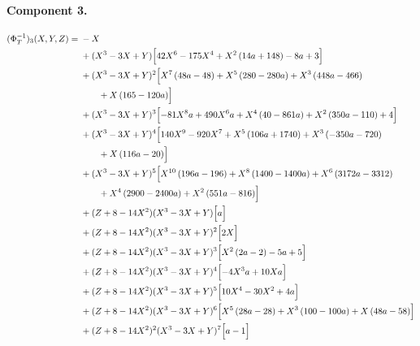 \paragraph{Component 3.}
\begingroup
\footnotesize
\allowdisplaybreaks[0]
\begin{align*}
(\Phi_T^{-1})_3(X,Y,Z)={}&- X\\
&{}+(X^3-3X+Y)\Bigl[42 X^{6} - 175 X^{4} + X^{2} \left(14 a + 148\right) - 8 a + 3\Bigr]\\
&{}+(X^3-3X+Y)^{2}\Bigl[X^{7} \left(48 a - 48\right) + X^{5} \left(280 - 280 a\right) + X^{3} \left(448 a - 466\right)\\
&\qquad + X \left(165 - 120 a\right)\Bigr]\\
&{}+(X^3-3X+Y)^{3}\Bigl[- 81 X^{8} a + 490 X^{6} a + X^{4} \left(40 - 861 a\right) + X^{2} \left(350 a - 110\right) + 4\Bigr]\\
&{}+(X^3-3X+Y)^{4}\Bigl[140 X^{9} - 920 X^{7} + X^{5} \left(106 a + 1740\right) + X^{3} \left(- 350 a - 720\right)\\
&\qquad + X \left(116 a - 20\right)\Bigr]\\
&{}+(X^3-3X+Y)^{5}\Bigl[X^{10} \left(196 a - 196\right) + X^{8} \left(1400 - 1400 a\right) + X^{6} \left(3172 a - 3312\right)\\
&\qquad + X^{4} \left(2900 - 2400 a\right) + X^{2} \left(551 a - 816\right)\Bigr]\\
&{}+(Z+8-14X^2)(X^3-3X+Y)\Bigl[a\Bigr]\\
&{}+(Z+8-14X^2)(X^3-3X+Y)^{2}\Bigl[2 X\Bigr]\\
&{}+(Z+8-14X^2)(X^3-3X+Y)^{3}\Bigl[X^{2} \left(2 a - 2\right) - 5 a + 5\Bigr]\\
&{}+(Z+8-14X^2)(X^3-3X+Y)^{4}\Bigl[- 4 X^{3} a + 10 X a\Bigr]\\
&{}+(Z+8-14X^2)(X^3-3X+Y)^{5}\Bigl[10 X^{4} - 30 X^{2} + 4 a\Bigr]\\
&{}+(Z+8-14X^2)(X^3-3X+Y)^{6}\Bigl[X^{5} \left(28 a - 28\right) + X^{3} \left(100 - 100 a\right) + X \left(48 a - 58\right)\Bigr]\\
&{}+(Z+8-14X^2)^{2}(X^3-3X+Y)^{7}\Bigl[a - 1\Bigr]
\end{align*}
\endgroup

